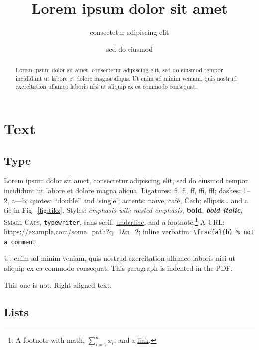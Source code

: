 \documentclass[11pt,letterpaper]{article}
\title{Lorem ipsum dolor sit amet}
\author{consectetur adipiscing elit}
\date{sed do eiusmod}
\theoremstyle{definition}
\theoremstyle{remark}
\begin{document}
\maketitle
\begin{abstract}
    Lorem ipsum dolor sit amet, consectetur adipiscing elit, sed do eiusmod tempor incididunt ut labore et dolore magna aliqua.
    Ut enim ad minim veniam, quis nostrud exercitation ullamco laboris nisi ut aliquip ex ea commodo consequat.
\end{abstract}
\tableofcontents


\section{Text}

\subsection{Type}

Lorem ipsum dolor sit amet, consectetur adipiscing elit, sed do eiusmod tempor incididunt ut labore et dolore magna aliqua.
Ligatures: fi, fl, ff, ffi, ffl; dashes: 1--2, a---b; quotes: ``double'' and `single'; accents: na\"ive, caf\'e, \v{C}ech; ellipsis\ldots{} and a tie in Fig.~\ref{fig:tikz}.
Styles: \emph{emphasis with \emph{nested} emphasis}, \textbf{bold}, \textit{\textbf{bold italic}}, \textsc{Small Caps}, \texttt{typewriter}, \textsf{sans serif}, \underline{underline}, and a footnote.\footnote{A footnote with math, $\sum_{i=1}^n x_i$, and a \href{https://example.com}{link}.}
A URL: \url{https://example.com/some_path?q=1&r=2}; inline verbatim: \verb|\frac{a}{b} % not a comment|.

Ut enim ad minim veniam, quis nostrud exercitation ullamco laboris nisi ut aliquip ex ea commodo consequat.
This paragraph is indented in the PDF.

\noindent This one is not.
\hfill Right-aligned text.

\subsection{Lists}
\end{document}
